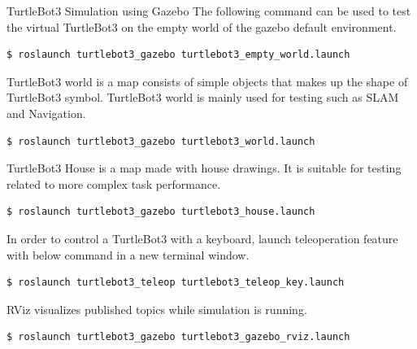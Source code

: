 \begin{frame}[fragile]{TurtleBot3 Simulation using Gazebo}
The following command can be used to test the virtual TurtleBot3 on the empty world of the gazebo default environment.
\begin{lstlisting}[language=shell]
$ roslaunch turtlebot3_gazebo turtlebot3_empty_world.launch
\end{lstlisting}

TurtleBot3 world is a map consists of simple objects that makes up the shape of TurtleBot3 symbol. TurtleBot3 world is mainly used for testing such as SLAM and Navigation.  
\begin{lstlisting}[language=shell]
$ roslaunch turtlebot3_gazebo turtlebot3_world.launch
\end{lstlisting}

TurtleBot3 House is a map made with house drawings. It is suitable for testing related to more complex task performance.
\begin{lstlisting}[language=shell]
$ roslaunch turtlebot3_gazebo turtlebot3_house.launch
\end{lstlisting}

In order to control a TurtleBot3 with a keyboard, launch teleoperation feature with below command in a new terminal window.
\begin{lstlisting}[language=shell]
$ roslaunch turtlebot3_teleop turtlebot3_teleop_key.launch
\end{lstlisting}

RViz visualizes published topics while simulation is running. 
\begin{lstlisting}[language=shell]
$ roslaunch turtlebot3_gazebo turtlebot3_gazebo_rviz.launch
\end{lstlisting}
\end{frame}